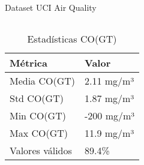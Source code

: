 \documentclass[aspectratio=169]{beamer}
\begin{document}
\begin{frame}{Dataset UCI Air Quality}
\begin{columns}[T]
        \begin{column}{0.35\textwidth}
            \begin{table}
                \centering
                \small
                \begin{tabular}{ll}
                    \toprule
                    \textbf{Métrica} & \textbf{Valor} \\
                    \midrule
                    Media CO(GT) & 2.11 mg/m³ \\
                    Std CO(GT) & 1.87 mg/m³ \\
                    Min CO(GT) & -200 mg/m³ \\
                    Max CO(GT) & 11.9 mg/m³ \\
                    Valores válidos & 89.4\% \\
                    \bottomrule
                \end{tabular}
                \caption{Estadísticas CO(GT)}
            \end{table}
        \end{column}
    \end{columns}
\end{frame}
\end{document}
